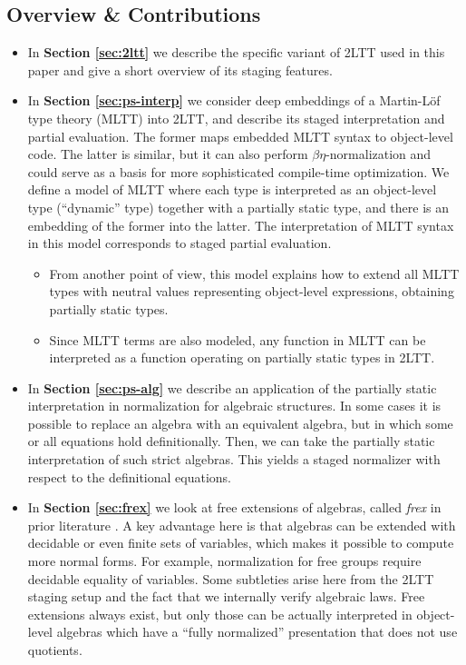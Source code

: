 \documentclass[acmsmall,review,screen]{acmart}
\theoremstyle{remark}
\begin{document}
\subsection{Overview \& Contributions}\label{sec:overview}
\begin{itemize}
\item In \textbf{Section \ref{sec:2ltt}} we describe the specific variant of 2LTT used
      in this paper and give a short overview of its staging features.
\item In \textbf{Section \ref{sec:ps-interp}} we consider deep embeddings of a
      Martin-Löf type theory (MLTT) into 2LTT, and describe its staged
      interpretation and partial evaluation. The former maps embedded MLTT syntax to
      object-level code. The latter is similar, but it can also perform
      $\beta\eta$-normalization and could serve as a basis for more sophisticated
      compile-time optimization. We define a model of MLTT where each type is
      interpreted as an object-level type (``dynamic'' type) together with a
      partially static type, and there is an embedding of the former into the
      latter.  The interpretation of MLTT syntax in this model corresponds to staged
      partial evaluation.
      \begin{itemize}
        \item  From another point of view, this model explains how to extend all MLTT types
               with neutral values representing object-level expressions, obtaining partially
               static types.
        \item Since MLTT terms are also modeled, any function in MLTT can be
              interpreted as a function operating on partially static types in 2LTT.
      \end{itemize}
\item In \textbf{Section \ref{sec:ps-alg}} we describe an application of the
  partially static interpretation in normalization for algebraic structures.  In
  some cases it is possible to replace an algebra with an equivalent algebra,
  but in which some or all equations hold definitionally. Then, we can take the
  partially static interpretation of such strict algebras. This yields a staged
  normalizer with respect to the definitional equations.

\item In \textbf{Section \ref{sec:frex}} we look at free extensions of algebras,
  called \emph{frex} in prior literature
  \cite{DBLP:journals/pacmpl/YallopGK18}. A key advantage here is that algebras
  can be extended with decidable or even finite sets of variables, which makes
  it possible to compute more normal forms. For example, normalization for free
  groups require decidable equality of variables. Some subtleties arise here
  from the 2LTT staging setup and the fact that we internally verify algebraic
  laws. Free extensions always exist, but only those can be actually interpreted in
  object-level algebras which have a ``fully normalized'' presentation that does not
  use quotients.
\end{itemize}
\end{document}
